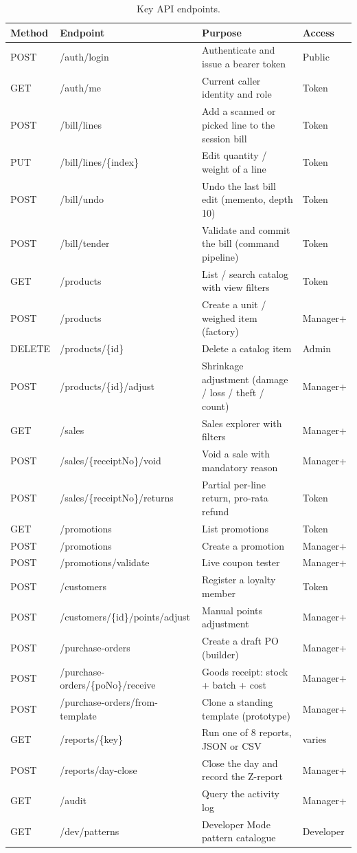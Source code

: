 \documentclass[12pt,a4paper]{report}
\begin{document}
\begin{table}[H]
\centering
\caption{Key API endpoints.}
\label{tab:endpoints}
\small
\begin{tabularx}{\textwidth}{l l X l}
\toprule
\textbf{Method} & \textbf{Endpoint} & \textbf{Purpose} & \textbf{Access} \\
\midrule
POST   & /auth/login & Authenticate and issue a bearer token & Public \\
GET    & /auth/me & Current caller identity and role & Token \\
POST   & /bill/lines & Add a scanned or picked line to the session bill & Token \\
PUT    & /bill/lines/\{index\} & Edit quantity / weight of a line & Token \\
POST   & /bill/undo & Undo the last bill edit (memento, depth 10) & Token \\
POST   & /bill/tender & Validate and commit the bill (command pipeline) & Token \\
GET    & /products & List / search catalog with view filters & Token \\
POST   & /products & Create a unit / weighed item (factory) & Manager+ \\
DELETE & /products/\{id\} & Delete a catalog item & Admin \\
POST   & /products/\{id\}/adjust & Shrinkage adjustment (damage / loss / theft / count)
& Manager+ \\
GET    & /sales & Sales explorer with filters & Manager+ \\
POST   & /sales/\{receiptNo\}/void & Void a sale with mandatory reason & Manager+ \\
POST   & /sales/\{receiptNo\}/returns & Partial per-line return, pro-rata refund &
Token \\
GET    & /promotions & List promotions & Token \\
POST   & /promotions & Create a promotion & Manager+ \\
POST   & /promotions/validate & Live coupon tester & Manager+ \\
POST   & /customers & Register a loyalty member & Token \\
POST   & /customers/\{id\}/points/adjust & Manual points adjustment & Manager+ \\
POST   & /purchase-orders & Create a draft PO (builder) & Manager+ \\
POST   & /purchase-orders/\{poNo\}/receive & Goods receipt: stock + batch + cost &
Manager+ \\
POST   & /purchase-orders/from-template & Clone a standing template (prototype) &
Manager+ \\
GET    & /reports/\{key\} & Run one of 8 reports, JSON or CSV & varies \\
POST   & /reports/day-close & Close the day and record the Z-report & Manager+ \\
GET    & /audit & Query the activity log & Manager+ \\
GET    & /dev/patterns & Developer Mode pattern catalogue & Developer \\
\bottomrule
\end{tabularx}
\end{table}
\end{document}
